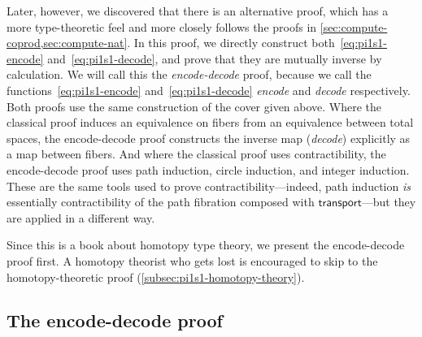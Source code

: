 Later, however, we discovered that there is an alternative proof, which has a more type-theoretic feel and more closely follows the proofs in \autoref{sec:compute-coprod,sec:compute-nat}.
In this proof, we directly construct both~\eqref{eq:pi1s1-encode} and~\eqref{eq:pi1s1-decode}, and prove that they are mutually inverse by calculation.
We will call this the \emph{encode-decode} proof, because we call the functions~\eqref{eq:pi1s1-encode} and~\eqref{eq:pi1s1-decode} \emph{encode} and \emph{decode} respectively.
Both proofs use the same construction of the cover given above.
Where the classical proof induces an equivalence on fibers from an equivalence between total spaces, the encode-decode proof constructs the inverse map (\emph{decode}) explicitly as a map between fibers.
And where the classical proof uses contractibility, the encode-decode proof uses path induction, circle induction, and integer induction.
These are the same tools used to prove contractibility---indeed, path induction \emph{is} essentially contractibility of the path fibration composed with $\mathsf{transport}$---but they are applied in a different way.

Since this is a book about homotopy type theory, we present the encode-decode proof first.
A homotopy theorist who gets lost is encouraged to skip to the homotopy-theoretic proof (\autoref{subsec:pi1s1-homotopy-theory}).

\subsection{The encode-decode proof}
\label{subsec:pi1s1-encode-decode}

